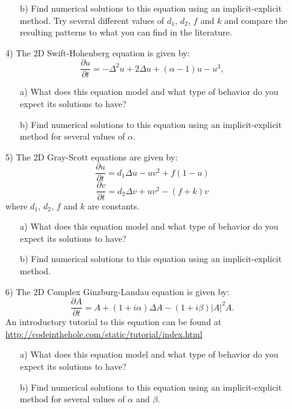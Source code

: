 \begin{enumerate}
\begin{itemize}
\item[b)] Find numerical solutions to this equation using an implicit-explicit method. Try several different values of $d_1$, $d_2$, $f$ and $k$ and compare the resulting patterns to what you can find in the literature.
\end{itemize}
\item[4)] The 2D Swift-Hohenberg equation is given by:
$$\frac{\partial u}{\partial t}=-\Delta^2u+2\Delta u+ (\alpha-1)u-u^3,$$
\begin{itemize}
\item[a)] What does this equation model and what type of behavior do you expect its solutions to have?
\item[b)] Find numerical solutions to this equation using an implicit-explicit method for several values of $\alpha$.
\end{itemize}
\item[5)] The 2D Gray-Scott equations are given by:
$$\frac{\partial u}{\partial t}=d_1\Delta u -uv^2+f(1-u)$$
$$\frac{\partial v}{\partial t}=d_2\Delta v  + uv^2 - (f+k)v$$
where $d_1$, $d_2$, $f$ and $k$ are constants. 
\begin{itemize}
\item[a)] What does this equation model and what type of behavior do you expect its solutions to have?
\item[b)] Find numerical solutions to this equation using an implicit-explicit method.
\end{itemize}
\item[6)] The 2D Complex Ginzburg-Landau equation is given by:
$$\frac{\partial A}{\partial t}=A+(1+i\alpha)\Delta A- (1+i\beta)|A|^2A.$$
An introductory tutorial to this equation can be found at \url{http://codeinthehole.com/static/tutorial/index.html}
\begin{itemize}
\item[a)] What does this equation model and what type of behavior do you expect its solutions to have?
\item[b)] Find numerical solutions to this equation using an implicit-explicit method for several values of $\alpha$ and $\beta$.
\end{itemize}
\end{enumerate}
